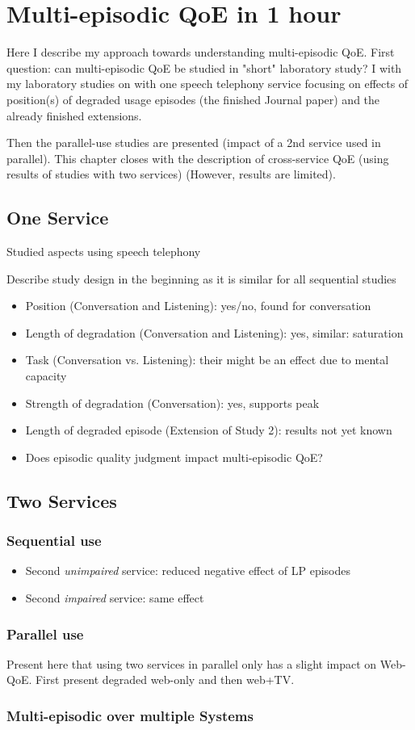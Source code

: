 \chapter{Multi-episodic QoE in 1 hour}\label{chap:06}
\begin{chapter-abstract}
Here I describe my approach towards understanding multi-episodic QoE.
First question: can multi-episodic QoE be studied in "short" laboratory study?
I with my laboratory studies on with one speech telephony service focusing on effects of position(s) of degraded usage episodes (the finished Journal paper) and the already finished extensions.

Then the parallel-use studies are presented (impact of a 2nd service used in parallel).
This chapter closes with the description of cross-service QoE (using results of studies with two services) (However, results are limited).
\end{chapter-abstract}

\section{One Service}
Studied aspects using speech telephony

Describe study design in the beginning as it is similar for all sequential studies

\begin{itemize}
\item Position (Conversation and Listening): yes/no, found for conversation
\item Length of degradation (Conversation and Listening): yes, similar: saturation
\item Task (Conversation vs. Listening): their might be an effect due to mental capacity
\item Strength of degradation (Conversation): yes, supports peak
\item Length of degraded episode (Extension of Study 2): results not yet known %
\item Does episodic quality judgment impact multi-episodic QoE? %
\end{itemize}

\section{Two Services}
\subsection{Sequential use}
\begin{itemize}
\item Second \textit{unimpaired} service: reduced negative effect of LP episodes
\item Second \textit{impaired} service: same effect
\end{itemize}

\subsection{Parallel use}
Present here that using two services in parallel only has a slight impact on Web-QoE.
First present degraded web-only and then web+TV.

\subsection{Multi-episodic over multiple Systems} %